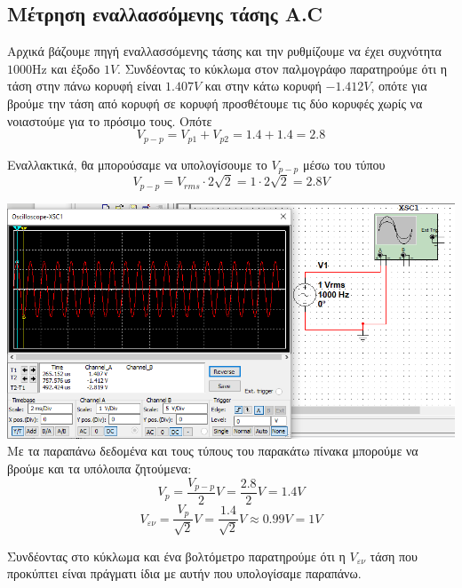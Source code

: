 \documentclass{article}
\begin{document}
\subsection{Μέτρηση εναλλασσόμενης τάσης A.C}
Αρχικά βάζουμε πηγή εναλλασσόμενης τάσης και την ρυθμίζουμε να
έχει συχνότητα $1000\si{\hertz}$ και έξοδο $1V$. Συνδέοντας το κύκλωμα στον
παλμογράφο παρατηρούμε ότι η τάση στην πάνω κορυφή είναι $1.407V$ και
στην κάτω κορυφή $-1.412V$, οπότε για βρούμε την τάση από κορυφή σε
κορυφή προσθέτουμε τις δύο κορυφές χωρίς να νοιαστούμε για το πρόσιμο
τους. Οπότε
\[V_{p-p} = V_{p1} + V_{p2} = 1.4 + 1.4 = 2.8\]

Εναλλακτικά, θα μπορούσαμε να υπολογίσουμε το $V_{p-p}$ μέσω του
τύπου
\[V_{p-p} = V_{rms} \cdot 2\sqrt 2 = 1 \cdot 2\sqrt 2 = 2.8V\]

\includegraphics[width=\textwidth]{./res/ex2circ.png} \\

Mε τα παραπάνω δεδομένα και τους τύπους του παρακάτω πίνακα μπορούμε να 
βρούμε και τα υπόλοιπα ζητούμενα:
\[V_p = \frac{V_{p-p}}{2}V = \frac{2.8}{2}V = 1.4V\]
\[V_{εν} = \frac{V_p}{\sqrt 2}V = \frac{1.4}{\sqrt 2}V \approx 0.99V = 1V\]

Συνδέοντας στο κύκλωμα και ένα βολτόμετρο παρατηρούμε ότι η $V_{εν}$ τάση
που προκύπτει είναι πράγματι ίδια με αυτήν που υπολογίσαμε παραπάνω.
\end{document}
